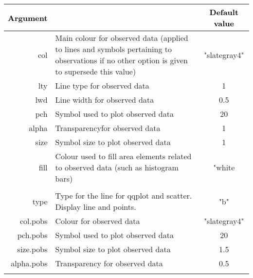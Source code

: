 \begin{table}[!h] 
\vspace{-2cm}
\begin{center}
\begin{tabular}{| r p{8cm} c|}
\hline
\textbf{\textcolor{black}{Argument}} & \centering{\textbf{\textcolor{black}{Description }}} & \textbf{\textcolor{black}{Default value}} \\
\hline
{\ttfamily col} & Main colour for observed data (applied to lines and symbols pertaining to observations if no other option is given to supersede this value) & "slategray4"  \\
{\ttfamily lty} & Line type for observed data & 1 \\
{\ttfamily lwd} & Line width for observed data & 0.5 \\
{\ttfamily pch} & Symbol used to plot observed data &  20 \\
{\ttfamily alpha} & Transparencyfor observed data  & 1 \\
{\ttfamily size} & Symbol size to plot observed data & 1  \\
{\ttfamily fill} & Colour used to fill area elements related to observed data (such as histogram bars) & "white  \\
{\ttfamily } & &  \\
{\ttfamily type } &  Type for the line for qqplot and scatter. Display line and points. & "b"  \\
{\ttfamily col.pobs} & Colour for observed data & "slategray4"  \\
{\ttfamily pch.pobs} & Symbol used to plot observed data &  20 \\
{\ttfamily size.pobs} & Symbol size to plot observed data & 1.5  \\
{\ttfamily alpha.pobs} & Transparency for observed data  & 0.5  \\
{\ttfamily } & &  \\


\end{tabular}
\end{center}
\end{table}
